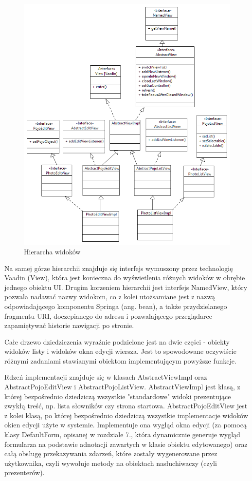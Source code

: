 \begin{figure} [H]
    \begin{center}
	\includegraphics[scale=.55]{img/viewHierarchy.png}
	\caption{Hierarcha widoków}
	\label{viewHierarchy}
    \end{center}
\end{figure}

Na samej górze hierarchii znajduje się interfejs wymuszony przez technologię Vaadin (View), która jest konieczna do wyświetlenia różnych widoków w obrębie jednego obiektu UI. Drugim korzeniem hierarchii jest interfejs NamedView, który pozwala nadawać nazwy widokom, co z kolei utożsamiane jest z nazwą odpowiadającego komponentu Springa (ang. bean), a także przydzielanego fragmentu URI, doczepianego do adresu i pozwalającego przeglądarce zapamiętywać historie nawigacji po stronie.

Całe drzewo dziedziczenia wyraźnie podzielone jest na dwie części - obiekty widoków listy i widoków okna edycji wiersza. Jest to spowodowane oczywiście różnymi zadaniami stawianymi obiektom implementującym powyższe funkcje.

\newpage
Rdzeń implementacji znajduje się w klasach AbstractViewImpl oraz AbstractPojoEditView i AbstractPojoListView. AbstractViewImpl jest klasą, z której bezpośrednio dziedziczą wszystkie "standardowe" widoki prezentujące zwykłą treść, np. lista słowników czy strona startowa. AbstractPojoEditView jest z kolei klasą, po której bezpośrednio dziedziczą wszystkie implementacje widoków okien edycji użyte w systemie. Implementuje ona wygląd okna edycji (za pomocą klasy DefaultForm, opisanej w rozdziale 7., która dynamicznie generuje wygląd formularza na podstawie adnotacji zawartych w klasie obiektu edytowanego) oraz całą obsługę przekazywania zdarzeń, które zostały wygenerowane przez użytkownika, czyli wywołuje metody na obiektach nasłuchiwaczy (czyli prezenterów).

